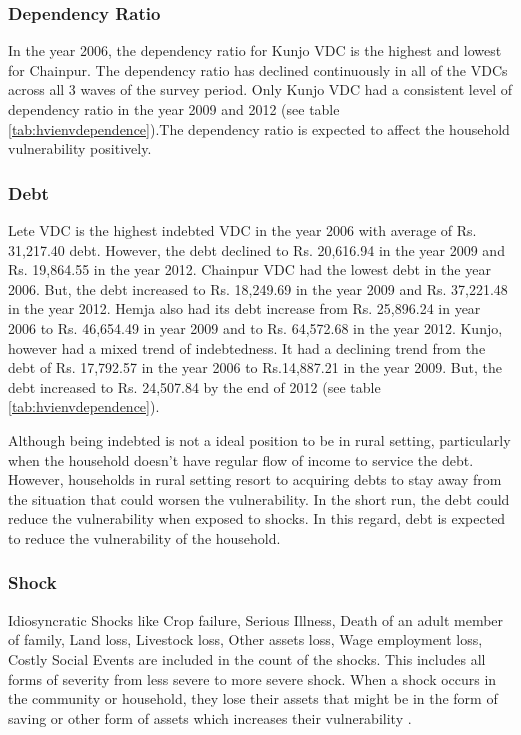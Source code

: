 \subsubsection{Dependency Ratio}
In the year 2006, the dependency ratio for Kunjo VDC is the highest and lowest for Chainpur. The dependency ratio has declined continuously in all of the VDCs across all 3 waves of the survey period. Only Kunjo VDC had a consistent level of dependency ratio in the year 2009 and 2012 (see table \ref{tab:hvienvdependence}).The dependency ratio is expected to affect the household vulnerability positively.\par

\subsubsection{Debt}
Lete VDC is the highest indebted VDC in the year 2006 with average of Rs. 31,217.40 debt. However, the debt declined to Rs. 20,616.94 in the year 2009 and Rs. 19,864.55 in the year 2012. Chainpur VDC had the lowest debt in the year 2006. But, the debt increased to Rs. 18,249.69 in the year 2009 and Rs. 37,221.48 in the year 2012. Hemja also had its debt increase from Rs. 25,896.24 in year 2006 to Rs. 46,654.49 in year 2009 and to Rs. 64,572.68 in the year 2012. Kunjo, however had a mixed trend of indebtedness. It had a declining trend from the debt of Rs. 17,792.57 in the year 2006 to Rs.14,887.21 in the year 2009. But, the debt increased to Rs. 24,507.84 by the end of 2012 (see table \ref{tab:hvienvdependence}).\par

Although being indebted is not a ideal position to be in rural setting, particularly when the household doesn't have regular flow of income to service the debt. However, households in rural setting resort to acquiring debts to stay away from the situation that could worsen the vulnerability. In the short run, the debt could reduce the vulnerability when exposed to shocks. In this regard, debt is expected to reduce the vulnerability of the household.\par 

\subsubsection{Shock}
Idiosyncratic Shocks like Crop failure, Serious Illness, Death of an adult member of family, Land loss, Livestock loss, Other assets loss, Wage employment loss, Costly Social Events are included in the count of the shocks. This includes all forms of severity from less severe to more severe shock. When a shock occurs in the community or household, they lose their assets that might be in the form of saving or other form of assets which increases their vulnerability \citep{dercon2006vulnerability}.\par  

